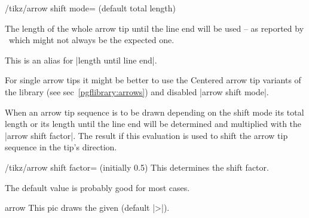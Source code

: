 \begin{multicols}{2}
\begin{key}{/tikz/arrow shift mode= (default total length)}
\begin{description}
  The length of the whole arrow tip until the line end will be used --
  as reported by \pgfname\ which might not always be the expected one.
\item[|arrow shift mode|=\declare{|line end|}]

  This is an alias for |length until line end|.
\end{description}

For single arrow tips it might be better to use the Centered arrow tip variants
of the  library (see sec~\ref{pgflibrary:arrows})
and disabled |arrow shift mode|.
\end{key}

When an arrow tip sequence is to be drawn depending on the shift mode
its total length or its length until the line end will be determined
and multiplied with the |arrow shift factor|.
The result if this evaluation is used to shift the arrow tip sequence
in the tip's direction.

\begin{key}{/tikz/arrow shift factor= (initially 0.5)}
  This determines the shift factor.
  
  The default value is probably good for most cases.
\end{key}
\begin{codeexample}[preamble=\usetikzlibrary{ext.arrows-plus}]
\end{codeexample}

\begin{pictype}{arrow}{}
  This pic draws the given  (default |>|).
  

\end{pictype}
\end{multicols}
